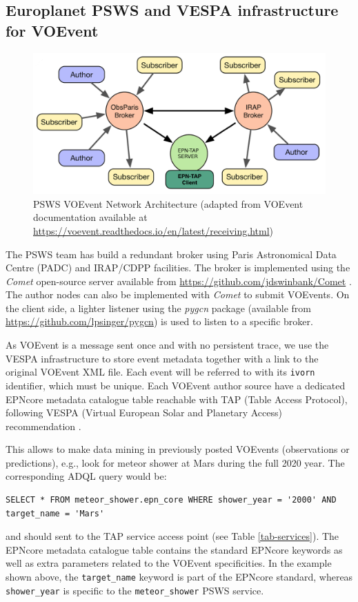 \documentclass[referee,a4paper,12pt,traditabstract]{swsc}
\begin{document}
\begin{linenumbers}
\section{Europlanet PSWS and VESPA infrastructure for VOEvent}

\begin{figure}
\centering\includegraphics[width=0.7\linewidth]{figure-psws-network.png}
\caption{PSWS VOEvent Network Architecture (adapted from VOEvent documentation available at \url{https://voevent.readthedocs.io/en/latest/receiving.html})}
\label{fig:architecture}
\end{figure}

The PSWS team has build a redundant broker using Paris Astronomical Data Centre (PADC) and IRAP/CDPP facilities.  The broker is implemented using the \emph{Comet} open-source server available from \url{https://github.com/jdswinbank/Comet} \cite{Swinbank:2014ft}. The author nodes can also be implemented with \emph{Comet} to submit VOEvents. On the client side, a lighter listener using the \emph{pygcn} package (available from \url{https://github.com/lpsinger/pygcn}) is used to listen to a specific broker. 


As VOEvent is a message sent once and with no persistent trace, we use the VESPA infrastructure to store event metadata together with a link to the original VOEvent XML file. Each event will be referred to with its {\tt ivorn} identifier, which must be unique. Each VOEvent author source have a dedicated EPNcore metadata catalogue table reachable with TAP (Table Access Protocol), following VESPA (Virtual European Solar and Planetary Access) recommendation \cite{vespa}.

This allows to make data mining in previously posted VOEvents (observations or predictions), e.g., look for meteor shower at Mars during the full 2020 year. The corresponding ADQL \cite{adql} query would be:
\begin{verbatim}
SELECT * FROM meteor_shower.epn_core WHERE shower_year = '2000' AND 
target_name = 'Mars' 
\end{verbatim}
and should sent to the TAP service access point (see Table \ref{tab-services}). The EPNcore metadata catalogue table contains the standard EPNcore keywords as well as extra parameters related to the VOEvent specificities. In the example shown above, the {\tt target\_name} keyword is part of the EPNcore standard, whereas {\tt shower\_year} is specific to the {\tt meteor\_shower} PSWS service.


\end{linenumbers}
\end{document}
